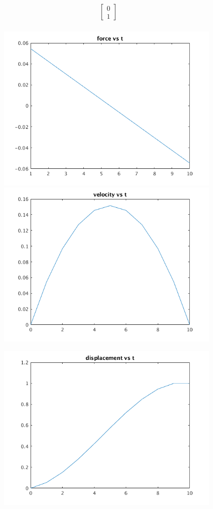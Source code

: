\documentclass[12pt,letter]{article}
\begin{document}
\begin{enumerate}
\begin{itemize}
\begin{align*}
      \begin{bmatrix}
        0\\
        1
      \end{bmatrix}\\
    \end{align*}
    \begin{figure}[H]
      \centering
      \includegraphics[width=11cm]{q9/part_a_plot_1.png}
      \includegraphics[width=11cm]{q9/part_a_plot_2.png}
    \end{figure}
    \begin{figure}[H]
      \centering
      \includegraphics[width=11cm]{q9/part_a_plot_3.png}

\end{figure}
\end{itemize}
\end{enumerate}
\end{document}
